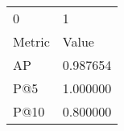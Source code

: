 \begin{tabular}{ll}
0 & 1 \\
Metric & Value \\
AP & 0.987654 \\
P@5 & 1.000000 \\
P@10 & 0.800000 \\
\end{tabular}
